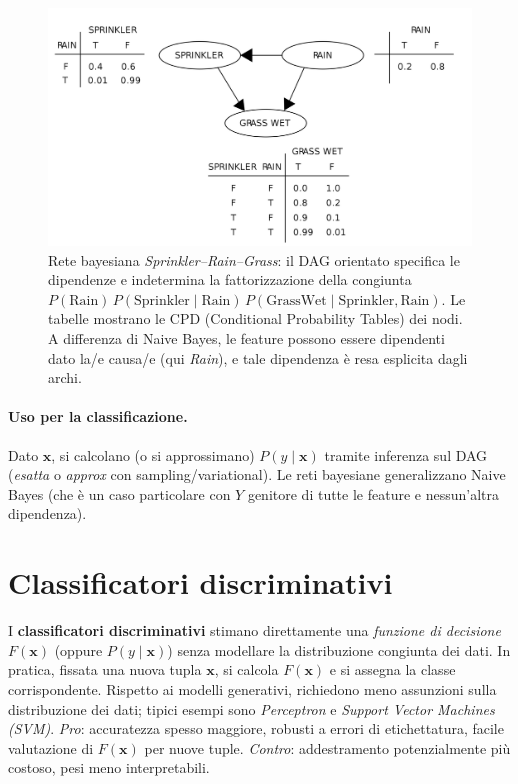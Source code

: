 \begin{figure}[htbp]
  \centering
  \includegraphics[width=.9\textwidth]{images/bayes_network_example.png}
  \caption[Bayes net Sprinkler–Rain–Grass]{Rete bayesiana \emph{Sprinkler–Rain–Grass}: il DAG orientato specifica le dipendenze e indetermina la fattorizzazione della congiunta
  \(P(\text{Rain})\,P(\text{Sprinkler}\mid \text{Rain})\,P(\text{GrassWet}\mid \text{Sprinkler},\text{Rain})\).
  Le tabelle mostrano le CPD (Conditional Probability Tables) dei nodi.
  A differenza di Naive Bayes, le feature possono essere dipendenti dato la/e causa/e (qui \textit{Rain}), e tale dipendenza è resa esplicita dagli archi.}
  \label{fig:bayes-net}
\end{figure}

\paragraph{Uso per la classificazione.}
Dato $\mathbf{x}$, si calcolano (o si approssimano) $P(y\mid \mathbf{x})$ tramite inferenza sul DAG (\emph{esatta} o \emph{approx} con sampling/variational). Le reti bayesiane generalizzano Naive Bayes (che è un caso particolare con $Y$ genitore di tutte le feature e nessun’altra dipendenza).

\section{Classificatori discriminativi}\label{sec:discriminativi}
I \textbf{classificatori discriminativi} stimano direttamente una \emph{funzione di decisione} \(F(\mathbf{x})\) (oppure \(P(y\mid\mathbf{x})\)) senza modellare la distribuzione congiunta dei dati. In pratica, fissata una nuova tupla \(\mathbf{x}\), si calcola \(F(\mathbf{x})\) e si assegna la classe corrispondente. Rispetto ai modelli generativi, richiedono meno assunzioni sulla distribuzione dei dati; tipici esempi sono \emph{Perceptron} e \emph{Support Vector Machines (SVM)}. \emph{Pro}: accuratezza spesso maggiore, robusti a errori di etichettatura, facile valutazione di \(F(\mathbf{x})\) per nuove tuple. \emph{Contro}: addestramento potenzialmente più costoso, pesi meno interpretabili. 

